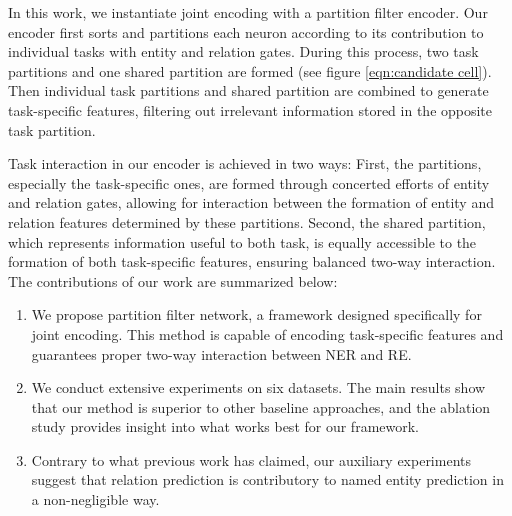 \documentclass[11pt]{article}
\begin{document}
In this work, we instantiate joint encoding with a partition filter encoder. Our encoder first sorts and partitions each neuron according to its contribution to individual tasks with entity and relation gates. During this process, two task partitions and one shared partition are formed (see figure \ref{eqn:candidate cell}). Then individual task partitions and shared partition are combined to generate task-specific features, filtering out irrelevant information stored in the opposite task partition.

Task interaction in our encoder is achieved in two ways: First, the partitions, especially the task-specific ones, are formed through concerted efforts of entity and relation gates, allowing for interaction between the formation of entity and relation features determined by these partitions. Second, the shared partition, which represents information useful to both task, is equally accessible to the formation of both task-specific features, ensuring balanced two-way interaction. The contributions of our work are summarized below:

\begin{enumerate}
\vspace{-2.5mm}
\item  We propose partition filter network, a framework designed specifically for joint encoding. This method is capable of encoding task-specific features and guarantees  proper two-way interaction between NER and RE.
\vspace{-2.3mm}
\item We conduct extensive experiments on six datasets. The main results show that our method is superior to other baseline approaches, and the ablation study provides insight into what works best for our framework.
\vspace{-5mm}
\item Contrary to what previous work has claimed, our auxiliary experiments suggest that relation prediction is contributory to named entity prediction in a non-negligible way.

\end{enumerate}
\end{document}
